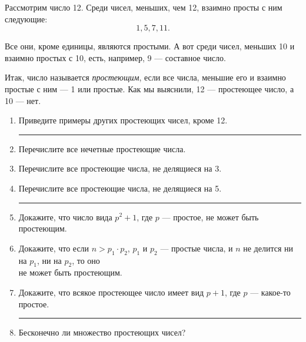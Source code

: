 ﻿
\def\lne{\medskip \\ \rule{0.65\textwidth}{0.028cm}}

\noindent Рассмотрим число 12. Среди чисел, меньших, чем 12, взаимно просты с ним следующие:
\vspace{-0.2cm}
$$1, 5, 7, 11.$$

\vspace{-0.2cm}
\noindent Все они, кроме единицы, являются простыми. А вот среди чисел, меньших 10 и взаимно простых с 10, есть, например, 9 — составное число.

\ms Итак, число называется {\itshape простеющим}, если все числа, меньшие его и взаимно простые с ним — 1 или простые. Как мы выяснили, 12 — простеющее число, а 10 — нет.

\begin{enumerate}

\vspace{0.25cm}
\item Приведите примеры других простеющих чисел, кроме 12.
\lne

\item Перечислите все нечетные простеющие числа.
\item Перечислите все простеющие числа, не делящиеся на 3.
\item Перечислите все простеющие числа, не делящиеся на 5.
\lne

\item Докажите, что число вида $p^2 + 1$, где $p$ — простое, не может быть простеющим.
\item Докажите, что если $n > p_1 \cdot p_2$, $p_1$ и $p_2$ — простые числа, и $n$ не делится ни на $p_1$, ни на $p_2$, то оно \\ не может быть простеющим.
\item Докажите, что всякое простеющее число имеет вид $p+1$, где $p$ — какое-то простое.
\lne

\item Бесконечно ли множество простеющих чисел?
\end{enumerate}